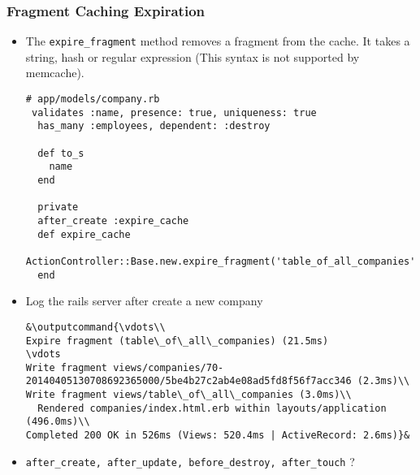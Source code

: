 \documentclass{beamer}
\newcommand{\outputcommand}[1]{\color{darkgreen}{#1}}
\begin{document}
\begin{frame}
\frametitle{Fragment Caching Expiration}
\begin{itemize}
\item The \texttt{expire\_fragment} method removes a fragment from the cache. It takes a string, hash or regular expression (\alert{This syntax is not supported by memcache}).

\lstset{language=Ruby, style=eclipse}
\begin{lstlisting}[escapechar=&]
# app/models/company.rb
 validates :name, presence: true, uniqueness: true
  has_many :employees, dependent: :destroy

  def to_s
    name
  end

  private
  after_create :expire_cache
  def expire_cache
    ActionController::Base.new.expire_fragment('table_of_all_companies')
  end
\end{lstlisting}

\item Log the rails server after create a new company

\lstset{language=shell}
\begin{lstlisting}[escapechar=&]
&\outputcommand{\vdots\\
Expire fragment (table\_of\_all\_companies) (21.5ms)
\vdots
Write fragment views/companies/70-20140405130708692365000/5be4b27c2ab4e08ad5fd8f56f7acc346 (2.3ms)\\
Write fragment views/table\_of\_all\_companies (3.0ms)\\
  Rendered companies/index.html.erb within layouts/application (496.0ms)\\
Completed 200 OK in 526ms (Views: 520.4ms | ActiveRecord: 2.6ms)}&
\end{lstlisting}

\item \texttt{after\_create, after\_update, before\_destroy, after\_touch} ?
\end{itemize}

\end{frame}
\end{document}
